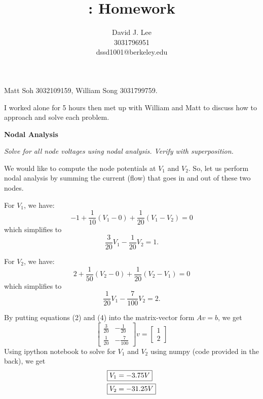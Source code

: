 \documentclass[letter]{article}
\title{\bCLASS: Homework \bHWN}
\author{David J. Lee\\3031796951\\dssd1001@berkeley.edu}
\newenvironment{menumerate}{%
  \edef\backupindent{\the\parindent}%
  \enumerate%
  \setlength{\parindent}{\backupindent}%
}{\endenumerate}
\begin{document}
\maketitle
\thispagestyle{empty}

\begin{menumerate}
    \item Matt Soh 3032109159, William Song 3031799759.

    I worked alone for 5 hours then met up with William and Matt to discuss how to approach and solve each problem.

    \item \textbf{Nodal Analysis}
    \begin{menumerate}
        \item \emph{Solve for all node voltages using nodal analysis. Verify with superposition.}

        We would like to compute the node potentials at $V_1$ and $V_2$. So, let us perform nodal analysis by summing the current (flow) that goes in and out of these two nodes.

        For $V_1$, we have:
        \begin{equation}
            -1 + \frac{1}{10}(V_1 - 0) + \frac{1}{20}(V_1 - V_2) = 0
        \end{equation}
        which simplifies to
        \begin{equation}
            \frac{3}{20}V_1 - \frac{1}{20}V_2 = 1.
        \end{equation}

        For $V_2$, we have:
        \begin{equation}
            2 + \frac{1}{50}(V_2 - 0) + \frac{1}{20}(V_2 - V_1) = 0
        \end{equation}
        which simplifies to
        \begin{equation}
            \frac{1}{20}V_1 - \frac{7}{100}V_2 = 2.
        \end{equation}

        By putting equations (2) and (4) into the matrix-vector form $Av = b$, we get
        \begin{equation}
            \begin{bmatrix}
                \frac{3}{20} & -\frac{1}{20} \\ \frac{1}{20} & -\frac{7}{100}
            \end{bmatrix}v =
            \begin{bmatrix}
                1 \\ 2
            \end{bmatrix}
        \end{equation}
        Using ipython notebook to solve for $V_1$ and $V_2$ using numpy (code provided in the back), we get
        \begin{align}
            \Aboxed{V_1 &= -3.75V} \\
            \Aboxed{V_2 &= -31.25 V}
        \end{align}


\end{menumerate}
\end{menumerate}
\end{document}
